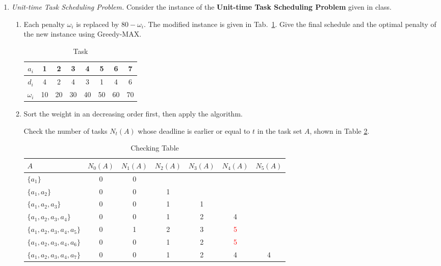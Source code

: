 \documentclass[12pt,a4paper]{article}
\makeatletter
\newtheorem*{solution}{Solution}
\theoremstyle{definition}
\renewenvironment{solution}[1][Solution] {\par\pushQED{\qed}\normalfont\topsep6\p@\@plus6\p@\relax\trivlist\item[\hskip\labelsep\bfseries#1\@addpunct{.}]\ignorespaces}{\popQED\endtrivlist\@endpefalse} \makeatother
\makeatother
\begin{document}
\begin{enumerate}
\begin{enumerate}
\begin{solution}
	\end{solution}

\end{enumerate}
\item \textit{Unit-time Task Scheduling Problem.} Consider the instance of the \textbf{Unit-time Task Scheduling Problem} given in class. 
    \begin{enumerate}
        \item Each penalty $\omega_{i}$ is replaced by $80-\omega_{i}$. The modified instance is given in Tab.~\ref{tab:1}. Give the final schedule and the optimal penalty of the new instance using Greedy-MAX.
		\begin{table}[H]
			\setlength{\abovecaptionskip}{0.cm}
			\setlength{\belowcaptionskip}{0.5cm}
			\centering
			\caption{Task}
			\label{tab:1}			
			\begin{tabular}{|c|ccccccc|}
				\hline
				$ a_{i} $&1&2&3&4&5&6&7\\
				\hline
				$ d_{i} $&4&2&4&3&1&4&6\\
                \hline
                $ \omega_{i} $&10&20&30&40&50&60&70\\
				\hline
			\end{tabular}
		\end{table}
		\begin{solution}
			Sort the weight in an decreasing order first, then apply the algorithm.
		\begin{tcolorbox}[skin=mycross]
		
			Check the number of tasks $N_t(A)$ whose deadline is earlier or equal to $t$ in the task set $A$, shown in Table \ref{tab:ct}.
			\begin{table}[H]
			\centering
			\caption{Checking Table}
			\label{tab:ct}
			\begin{tabular}{|l|cccccc|}
				\hline
				$A$ & $N_0(A)$ & $N_1(A)$ & $N_2(A)$ & $N_3(A)$ & $N_4(A)$ & $N_5(A)$\\
				\hline
				$\{a_1\}$ & 0 & 0 & & & & \\
				$\{a_1,a_2\}$ & 0 & 0 & 1 & & & \\
				$\{a_1,a_2,a_3\}$ & 0 & 0 & 1 & 1 & & \\
				$\{a_1,a_2,a_3,a_4\}$ & 0 & 0 & 1 & 2 & 4 & \\
				\textcolor{gray!50}{$\{a_1,a_2,a_3,a_4,a_5\}$} & 0 & 1 & 2 & 3 & \textcolor{red}{5} & \\
				\textcolor{gray!50}{$\{a_1,a_2,a_3,a_4,a_6\}$} & 0 & 0 & 1 & 2 & \textcolor{red}{5} & \\
				$\{a_1,a_2,a_3,a_4,a_7\}$ & 0 & 0 & 1 & 2 & 4 & 4\\
				\hline
			\end{tabular}
			\end{table}


\end{tcolorbox}
\end{solution}
\end{enumerate}
\end{enumerate}
\end{document}
